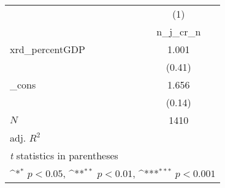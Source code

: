 {
\def\sym#1{\ifmmode^{#1}\else\(^{#1}\)\fi}
\begin{tabular}{l*{1}{c}}
\toprule
            &\multicolumn{1}{c}{(1)}\\
            &\multicolumn{1}{c}{n\_j\_cr\_n}\\
\midrule
xrd\_percentGDP&       1.001         \\
            &      (0.41)         \\
\addlinespace
\_cons      &       1.656         \\
            &      (0.14)         \\
\midrule
\(N\)       &        1410         \\
adj. \(R^{2}\)&                     \\
\bottomrule
\multicolumn{2}{l}{\footnotesize \textit{t} statistics in parentheses}\\
\multicolumn{2}{l}{\footnotesize \sym{*} \(p<0.05\), \sym{**} \(p<0.01\), \sym{***} \(p<0.001\)}\\
\end{tabular}
}
